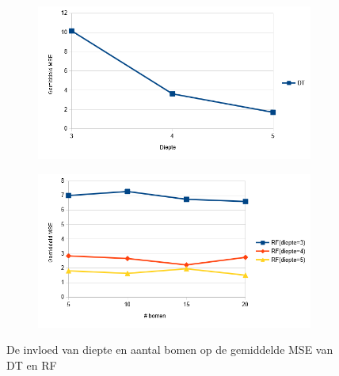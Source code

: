 \begin{figure}[htp!]
\centering
\begin{subfigure}{\textwidth}
  \centering
    \hspace*{-0.75cm}                                                           
  \includegraphics[width=\linewidth]{images/evaluatie/gemiddeldmsedt.png}
\end{subfigure}
\begin{subfigure}{\textwidth}
  \centering
  \includegraphics[width=\linewidth]{images/evaluatie/gemiddeldmserf.png}
\end{subfigure}
\caption{De invloed van diepte en aantal bomen op de gemiddelde MSE van DT en RF}
\label{fig:invloed diepte en aantal bomen mse}
\end{figure}
